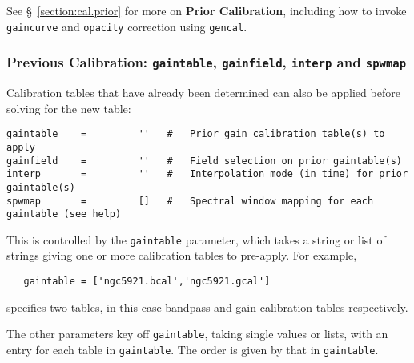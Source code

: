 See \S~\ref{section:cal.prior} for more on {\bf Prior Calibration},
including
how to invoke {\tt gaincurve} and {\tt opacity} correction using
{\tt gencal}.

\subsubsection{Previous Calibration: {\tt gaintable},
{\tt gainfield}, {\tt interp} and {\tt spwmap} }
\label{section:cal.solve.pars.previous}

Calibration tables that have already been determined can also be
applied before solving for the new table:
\small
\begin{verbatim}
gaintable    =         ''   #   Prior gain calibration table(s) to apply
gainfield    =         ''   #   Field selection on prior gaintable(s)
interp       =         ''   #   Interpolation mode (in time) for prior gaintable(s)
spwmap       =         []   #   Spectral window mapping for each gaintable (see help)
\end{verbatim}
\normalsize

This is controlled by the {\tt gaintable} parameter, which takes 
a string or list of strings giving one or more calibration tables 
to pre-apply.  For example,

\small
\begin{verbatim}
   gaintable = ['ngc5921.bcal','ngc5921.gcal']
\end{verbatim}
\normalsize
specifies two tables, in this case bandpass and gain calibration tables
respectively.

The other parameters key off {\tt gaintable}, taking single values or
lists, with an entry for each table in {\tt gaintable}.  The order is
given by that in {\tt gaintable}.

